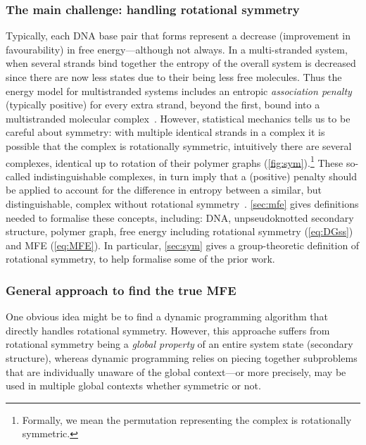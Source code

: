 \subsubsection{The main challenge: handling rotational symmetry}

Typically, each DNA base pair that forms represent a decrease (improvement in favourability) in free energy---although not always. 
In a multi-stranded system, when several strands bind together the entropy of the overall system is decreased since there are now less states due to their being less free molecules.  
Thus the energy model for multistranded systems includes an entropic {\em association penalty} (typically positive) for every extra strand, beyond the first, bound into a multistranded molecular  complex~\cite{dirks2007thermodynamic}. 
However, statistical mechanics tells us to be careful about symmetry: with multiple identical strands in a complex it is possible that the complex is rotationally symmetric, 
intuitively  there are several complexes, identical up to rotation of their polymer graphs (\cref{fig:sym}).\footnote{Formally, we mean the permutation representing the complex is rotationally symmetric.} 
These so-called indistinguishable complexes, in turn imply that a (positive) penalty should be applied to account for the difference in entropy between a similar, but distinguishable, complex without  rotational symmetry~\cite{bormashenko2019entropy,atkins2023atkins,silbey2022physical,fornace2020unified}. 
\cref{sec:mfe} gives definitions needed  to formalise these concepts, including: DNA,  
unpseudoknotted secondary structure, polymer graph,  
free energy including rotational symmetry (\cref{eq:DGss}) and MFE (\cref{eq:MFE}). In particular, \cref{sec:sym} gives a  group-theoretic definition of rotational symmetry, to help formalise some of the prior work.

\subsubsection{General approach to find the true MFE}
One obvious idea might be to find a dynamic programming algorithm that directly handles rotational symmetry. 
However, this approache suffers from rotational symmetry being a {\em global property} of an entire system state (secondary structure), whereas dynamic programming relies on piecing together subproblems that are individually unaware of the global context---or more precisely, may be used in multiple global contexts whether symmetric or not.  

